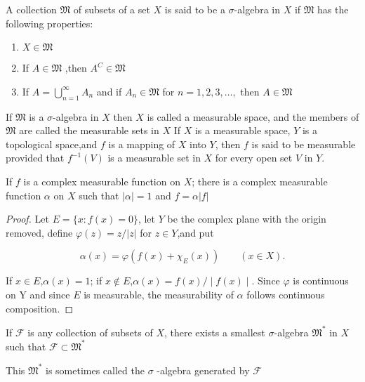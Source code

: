 \begin{definition}
    A collection $\mathfrak { M }$ of subsets of a set $X$ is said to be a $\sigma$-algebra 
    in $X$ if $\mathfrak { M }$ has the following properties:

\begin{enumerate}
    \item $X \in { \mathfrak { M } }$
    \item If $A \in { \mathfrak { M } }$ ,then $A^C \in \mathfrak { M }$
    \item If $A = \bigcup_{ n = 1 } ^ { \infty } A _ { n }$ and if $A _ { n } \in \mathfrak { M }$ for $n = 1 , 2 , 3 , \ldots ,$ then $A \in { \mathfrak { M } }$   
\end{enumerate}

If $\mathfrak { M }$ is a $\sigma$-algebra in $X$ then $X$ is called a measurable space, and the members of $\mathfrak { M }$ are called the measurable sets in $X$   
If $X$ is a measurable space, $Y$ is a topological space,and $f$ is a mapping of $X$ into $Y$, then $f$ is said to be measurable provided that $f ^ { - 1 } ( V )$ is a measurable set in $X$ for every open set $V$ in $Y$.

\end{definition}

\begin{thm}
If $f$ is a complex measurable function on $X$; 
there is a complex measurable function $ \alpha $ on $X$ 
such that $| \alpha | = 1$ and $f = \alpha \vert f \vert$
\end{thm}

\begin{proof}
Let $E = \{ x \colon f ( x ) = 0 \}$,
let $Y$ be the complex plane with the origin removed, 
define $\varphi ( z ) = z / | z |$ for $z \in  Y$,and put

$$
\alpha ( x ) = \varphi ( f ( x ) + \chi _ { E } ( x ) ) \qquad ( x \in X ) .
$$

If $x \in E$,$\alpha ( x ) = 1$; if $x \notin E$,$\alpha ( x ) = f ( x ) / \mid f ( x ) \mid$.
Since $\varphi$ is continuous on Y and
since $E$ is measurable, 
the measurability of $\alpha$ follows continuous composition.
\end{proof}

\begin{thm}
If $\mathscr { F }$ is any collection of subsets of $X$,
there exists a smallest $\sigma$-algebra ${ \mathfrak { M } } ^ { * }$ 
in $X$ such that ${ \mathscr { F } } \subset { \mathfrak { M } } ^ { * }$

This $\mathfrak { M } ^ { * }$ is 
sometimes called the $\sigma$ -algebra generated by $\mathscr { F }$

\end{thm}

